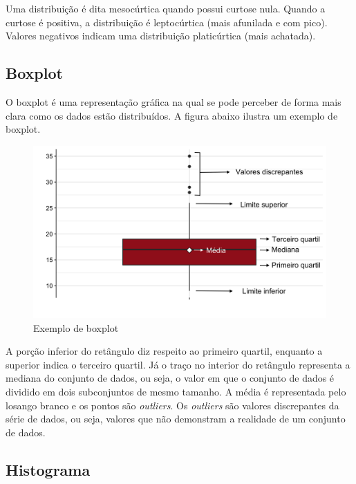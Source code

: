 \documentclass[
]{estat/estat}
\begin{document}
Uma distribuição é dita mesocúrtica quando possui curtose nula. Quando a
curtose é positiva, a distribuição é leptocúrtica (mais afunilada e com
pico). Valores negativos indicam uma distribuição platicúrtica (mais
achatada).

\subsection{Boxplot}\label{boxplot}

O boxplot é uma representação gráfica na qual se pode perceber de forma
mais clara como os dados estão distribuídos. A figura abaixo ilustra um
exemplo de boxplot.

\begin{figure}[H]

{\centering \includegraphics{images/box_uni.png}

}

\caption{Exemplo de boxplot}

\end{figure}%

A porção inferior do retângulo diz respeito ao primeiro quartil,
enquanto a superior indica o terceiro quartil. Já o traço no interior do
retângulo representa a mediana do conjunto de dados, ou seja, o valor em
que o conjunto de dados é dividido em dois subconjuntos de mesmo
tamanho. A média é representada pelo losango branco e os pontos são
\emph{outliers}. Os \emph{outliers} são valores discrepantes da série de
dados, ou seja, valores que não demonstram a realidade de um conjunto de
dados.

\subsection{Histograma}\label{histograma}
\end{document}
